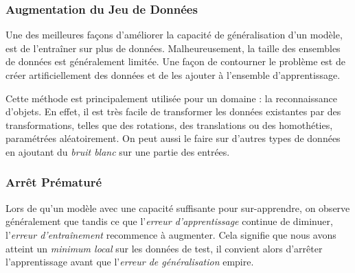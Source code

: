 \documentclass[a4paper, 11pt]{report}
\begin{document}
\subsubsection{Augmentation du Jeu de Données}
Une des meilleures façons d'améliorer la capacité de généralisation d'un modèle, est de l'entraîner sur plus de données.
Malheureusement, la taille des ensembles de données est généralement limitée.
Une façon de contourner le problème est de créer artificiellement des données et de les ajouter à l'ensemble d'apprentissage.

Cette méthode est principalement utilisée pour un domaine : la reconnaissance d'objets.
En effet, il est très facile de transformer les données existantes par des transformations, telles que des rotations, des translations ou des homothéties, paramétrées aléatoirement.
On peut aussi le faire sur d'autres types de données en ajoutant du \emph{bruit blanc} sur une partie des entrées.
\subsubsection{Arrêt Prématuré}
Lors de qu'un modèle avec une capacité suffisante pour sur-apprendre, on observe généralement que tandis ce que l'\emph{erreur d'apprentissage} continue de diminuer, l'\emph{erreur d'entraînement} recommence à augmenter.
Cela signifie que nous avons atteint un \emph{minimum local} sur les données de test, il convient alors d'arrêter l'apprentissage avant que l'\emph{erreur de généralisation} empire.
\end{document}
